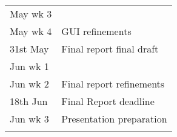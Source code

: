 \begin{table}[]
\begin{tabular}{ll}
May wk 3                    & \\
May wk 4                    &           
  \multirow{-2}{*}{GUI	refinements	}\\ \hline
31st May                    &	Final report final draft \\ \hline
Jun wk 1                    &	\\
Jun wk 2                    &   
\multirow{-2}{*}{Final report refinements}\\ \hline
\cellcolor[HTML]{FFFFC7} 18th Jun & \cellcolor[HTML]{FFFFC7} Final Report deadline\\ \hline
Jun wk 3                    &	Presentation preparation\\ \hline
                            &
\end{tabular}
\end{table}